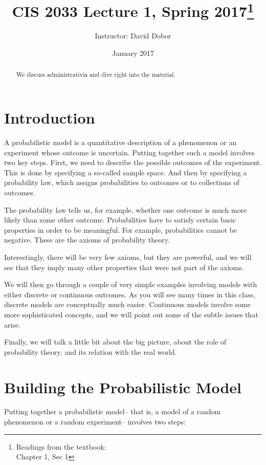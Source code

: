 \documentclass{tufte-handout}
\title{CIS 2033 Lecture 1, Spring 2017\thanks{Readings from the textbook: \\Chapter 1, Sec 1}}
\author[David Dobor]{Instructor: David Dobor}
\date{January 2017} %
\begin{document}
\maketitle%

\begin{abstract}
\noindent
We discuss administrativia and dive right into the material.
\end{abstract}


\section{Introduction}\label{sec:intro}
A probabilistic model is a quantitative description of 
a phenomenon or an experiment
whose outcome is uncertain. Putting together such a model involves two key steps. First, we need to
describe the possible outcomes of the experiment. This is done by specifying a so-called sample space.
And then by specifying a probability law, which assigns probabilities to outcomes or to collections of
outcomes.

The probability law tells us, for example, whether one outcome is much more likely than some other
outcome. Probabilities have to satisfy certain basic properties in order to be meaningful.  For example,
probabilities cannot be negative. These are the axioms of probability theory.

Interestingly, there will be very few axioms, but they are
powerful, and we will see that they imply many other
properties that were not part of the axioms.

We will then go through a couple of very simple examples involving models with either discrete or
continuous outcomes. As you will see many times in this class, discrete models are conceptually
much easier. Continuous models involve some more sophisticated concepts, and we will point out some
of the subtle issues that arise. 

Finally, we will talk a little bit about the big picture, about the role of
probability theory, and its relation with the real world.

\section{Building the Probabilistic Model}\label{sec:model-building}

Putting together a probabilistic model-- that is, a model of a random phenomenon or a random
experiment-- involves two steps:
\end{document}
